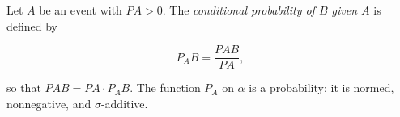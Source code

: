 Let $A$ be an event with $PA > 0$. The \textit{conditional probability of $B$ given $A$} is defined by

$$P_A B = \frac{PAB}{PA},$$

so that $PAB = PA \cdot P_A B$. The function $P_A$ on $\alpha$ is a probability: it is normed, nonnegative, and $\sigma$-additive.

